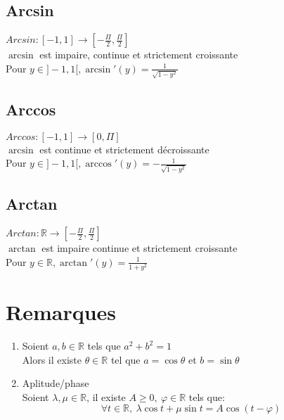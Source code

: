 \documentclass[fleqn]{article}
\theoremstyle{definition} \newtheorem*{defi}{D\'efinition}
\theoremstyle{definition} \newtheorem*{theo}{Th\'eor\`eme}
\theoremstyle{definition} \newtheorem*{prop}{Propri\'et\'e}
\begin{document}
\subsection{Arcsin}
\(Arcsin: [-1,1] \rightarrow [-\frac{\Pi}{2}, \frac{\Pi}{2}]\) \\
\(\arcsin\) est impaire, continue et strictement croissante \\
Pour \(y \in ]-1,1[, \arcsin'(y) = \frac{1}{\sqrt{1-y^2}}\) \\

\subsection{Arccos}
\(Arccos: [-1,1] \rightarrow [0, \Pi]\) \\
\(\arcsin\) est continue et strictement d\'{e}croissante \\
Pour \(y \in ]-1,1[, \arccos'(y) = -\frac{1}{\sqrt{1-y^2}}\) \\

\subsection{Arctan}
\(Arctan: \mathbb{R} \rightarrow [-\frac{\Pi}{2},\frac{\Pi}{2}]\) \\
\(\arctan\) est impaire continue et strictement croissante \\
Pour \(y \in \mathbb{R}, \arctan'(y) = \frac{1}{1+y^2}\) \\

\section{Remarques}
\begin{enumerate}
	\item Soient $a,b \in \mathbb{R}$ tels que $a^2 + b^2 = 1$\\
		Alors il existe $\theta \in \mathbb{R}$ tel que $a = \cos \theta$ et $b = \sin \theta$
	\item Aplitude/phase \\
		Soient $\lambda, \mu \in \mathbb{R}$, il existe $A \geq 0,\ \varphi \in \mathbb{R}$ tels que:
		\[\forall t \in \mathbb{R},\ \lambda \cos t + \mu \sin t = A\cos(t - \varphi)\]
\end{enumerate}
\end{document}
